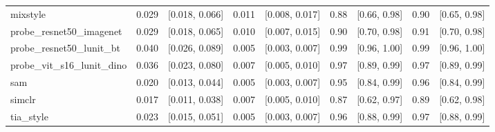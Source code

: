 \begin{tabular}{lrrrrrrrr}
mixstyle & 0.029 & [0.018, 0.066] & 0.011 & [0.008, 0.017] & 0.88 & [0.66, 0.98] & 0.90 & [0.65, 0.98] \\
probe\_resnet50\_imagenet & 0.029 & [0.018, 0.065] & 0.010 & [0.007, 0.015] & 0.90 & [0.70, 0.98] & 0.91 & [0.70, 0.98] \\
probe\_resnet50\_lunit\_bt & 0.040 & [0.026, 0.089] & 0.005 & [0.003, 0.007] & 0.99 & [0.96, 1.00] & 0.99 & [0.96, 1.00] \\
probe\_vit\_s16\_lunit\_dino & 0.036 & [0.023, 0.080] & 0.007 & [0.005, 0.010] & 0.97 & [0.89, 0.99] & 0.97 & [0.89, 0.99] \\
sam & 0.020 & [0.013, 0.044] & 0.005 & [0.003, 0.007] & 0.95 & [0.84, 0.99] & 0.96 & [0.84, 0.99] \\
simclr & 0.017 & [0.011, 0.038] & 0.007 & [0.005, 0.010] & 0.87 & [0.62, 0.97] & 0.89 & [0.62, 0.98] \\
tia\_style & 0.023 & [0.015, 0.051] & 0.005 & [0.003, 0.007] & 0.96 & [0.88, 0.99] & 0.97 & [0.88, 0.99] \\
\bottomrule
\end{tabular}
